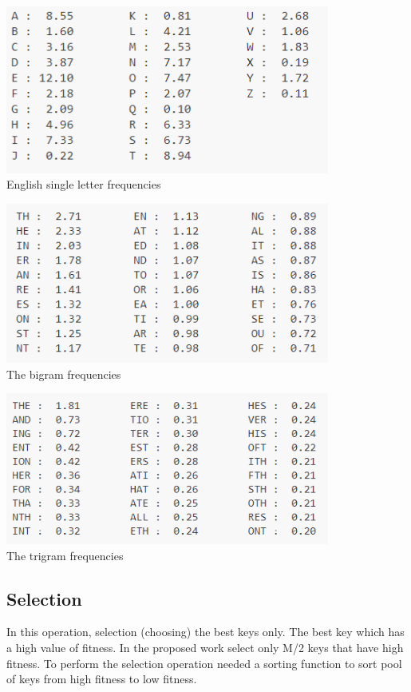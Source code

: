 \begin{table}[h!]
    \centering
    \includegraphics[width=0.8\textwidth]{imagenes/UI.png}\\
    \caption{English single letter frequencies}
    \label{UI}
\end{table}
\begin{table}[h!]
    \centering
    \includegraphics[width=0.8\textwidth]{imagenes/TIBI1.png}\\
    \caption{ The bigram frequencies}
    \label{TIBI1}
\end{table}
    \begin{table}[h!]
    \centering
    \includegraphics[width=0.8\textwidth]{imagenes/TIBI2.png}\\
    \caption{The trigram frequencies}
\label{TIBI2}
\end{table}
\newpage
\subsection{Selection}
In this operation, selection (choosing) the best keys only. The best key which has a high value of fitness. In the proposed work select only M/2 keys that have high fitness. To perform the selection operation needed a sorting function to sort pool of keys from high fitness to low fitness.

